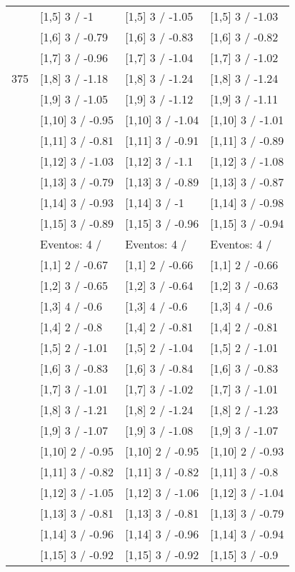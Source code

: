 \begin{table}
\begin{tabular}[t]{llll}
 & {}[1,5] 3  / -1 & {}[1,5] 3  / -1.05 & {}[1,5] 3  / -1.03\\
 & {}[1,6] 3  / -0.79 & {}[1,6] 3  / -0.83 & {}[1,6] 3  / -0.82\\
 & {}[1,7] 3  / -0.96 & {}[1,7] 3  / -1.04 & {}[1,7] 3  / -1.02\\
375 & {}[1,8] 3  / -1.18 & {}[1,8] 3  / -1.24 & {}[1,8] 3  / -1.24\\
\addlinespace
 & {}[1,9] 3  / -1.05 & {}[1,9] 3  / -1.12 & {}[1,9] 3  / -1.11\\
 & {}[1,10] 3  / -0.95 & {}[1,10] 3  / -1.04 & {}[1,10] 3  / -1.01\\
 & {}[1,11] 3  / -0.81 & {}[1,11] 3  / -0.91 & {}[1,11] 3  / -0.89\\
 & {}[1,12] 3  / -1.03 & {}[1,12] 3  / -1.1 & {}[1,12] 3  / -1.08\\
 & {}[1,13] 3  / -0.79 & {}[1,13] 3  / -0.89 & {}[1,13] 3  / -0.87\\
\addlinespace
 & {}[1,14] 3  / -0.93 & {}[1,14] 3  / -1 & {}[1,14] 3  / -0.98\\
 & {}[1,15] 3  / -0.89 & {}[1,15] 3  / -0.96 & {}[1,15] 3  / -0.94\\
 & Eventos:  4 / & Eventos:  4 / & Eventos:  4 /\\
 & {}[1,1] 2  / -0.67 & {}[1,1] 2  / -0.66 & {}[1,1] 2  / -0.66\\
 & {}[1,2] 3  / -0.65 & {}[1,2] 3  / -0.64 & {}[1,2] 3  / -0.63\\
\addlinespace
 & {}[1,3] 4  / -0.6 & {}[1,3] 4  / -0.6 & {}[1,3] 4  / -0.6\\
 & {}[1,4] 2  / -0.8 & {}[1,4] 2  / -0.81 & {}[1,4] 2  / -0.81\\
 & {}[1,5] 2  / -1.01 & {}[1,5] 2  / -1.04 & {}[1,5] 2  / -1.01\\
 & {}[1,6] 3  / -0.83 & {}[1,6] 3  / -0.84 & {}[1,6] 3  / -0.83\\
 & {}[1,7] 3  / -1.01 & {}[1,7] 3  / -1.02 & {}[1,7] 3  / -1.01\\
\addlinespace
500 & {}[1,8] 3  / -1.21 & {}[1,8] 2  / -1.24 & {}[1,8] 2  / -1.23\\
 & {}[1,9] 3  / -1.07 & {}[1,9] 3  / -1.08 & {}[1,9] 3  / -1.07\\
 & {}[1,10] 2  / -0.95 & {}[1,10] 2  / -0.95 & {}[1,10] 2  / -0.93\\
 & {}[1,11] 3  / -0.82 & {}[1,11] 3  / -0.82 & {}[1,11] 3  / -0.8\\
 & {}[1,12] 3  / -1.05 & {}[1,12] 3  / -1.06 & {}[1,12] 3  / -1.04\\
\addlinespace
 & {}[1,13] 3  / -0.81 & {}[1,13] 3  / -0.81 & {}[1,13] 3  / -0.79\\
 & {}[1,14] 3  / -0.96 & {}[1,14] 3  / -0.96 & {}[1,14] 3  / -0.94\\
 & {}[1,15] 3  / -0.92 & {}[1,15] 3  / -0.92 & {}[1,15] 3  / -0.9\\
\bottomrule
\end{tabular}
\end{table}
